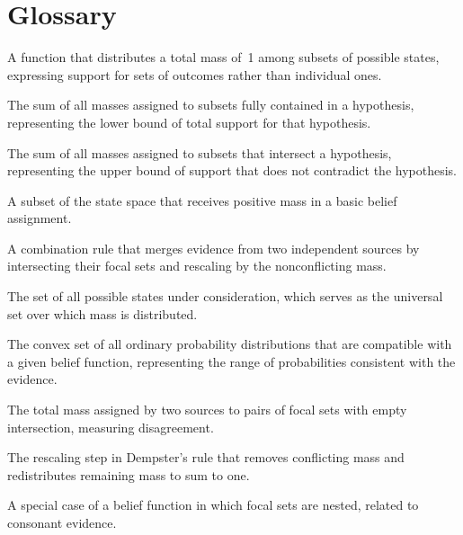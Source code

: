 \section*{Glossary}
\begin{description}[leftmargin=*,style=nextline,itemsep=0.3em]
\item[\textbf{Basic belief assignment.}] A function that distributes a total mass of~1 among subsets of possible states, expressing support for sets of outcomes rather than individual ones.
\item[\textbf{Belief.}] The sum of all masses assigned to subsets fully contained in a hypothesis, representing the lower bound of total support for that hypothesis.
\item[\textbf{Plausibility.}] The sum of all masses assigned to subsets that intersect a hypothesis, representing the upper bound of support that does not contradict the hypothesis.
\item[\textbf{Focal element.}] A subset of the state space that receives positive mass in a basic belief assignment.
\item[\textbf{Dempster's rule.}] A combination rule that merges evidence from two independent sources by intersecting their focal sets and rescaling by the nonconflicting mass.
\item[\textbf{Frame of discernment.}] The set of all possible states under consideration, which serves as the universal set over which mass is distributed.
\item[\textbf{Credal set.}] The convex set of all ordinary probability distributions that are compatible with a given belief function, representing the range of probabilities consistent with the evidence.
\item[\textbf{Conflict mass (K).}] The total mass assigned by two sources to pairs of focal sets with empty intersection, measuring disagreement.
\item[\textbf{Normalization.}] The rescaling step in Dempster's rule that removes conflicting mass and redistributes remaining mass to sum to one.
\item[\textbf{Possibility measure.}] A special case of a belief function in which focal sets are nested, related to consonant evidence.
\end{description}

